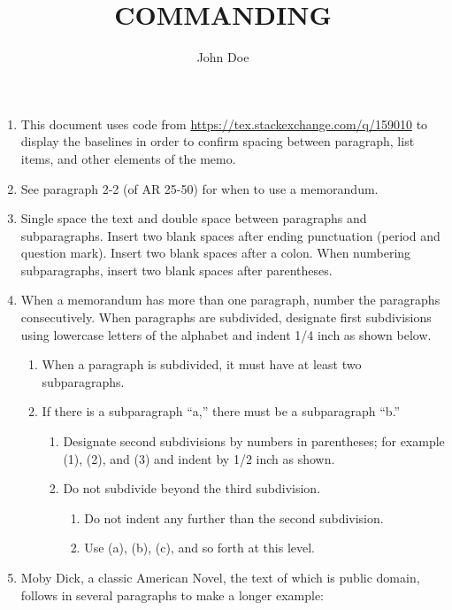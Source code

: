 \documentclass{armymemo}
\author{John Doe}\rank{CPT}\branch{CY}
\title{COMMANDING}
\begin{document}
\begin{enumerate}
\item This document uses code from \url{https://tex.stackexchange.com/q/159010}
  to display the baselines in order to confirm spacing between paragraph, list
  items, and other elements of the memo.
\item See paragraph 2-2 (of AR 25-50) for when to use a memorandum.
\item Single space the text and double space between paragraphs and subparagraphs. Insert two blank spaces after ending punctuation (period and question mark). Insert two blank spaces after a colon. When numbering subparagraphs, insert two blank spaces after parentheses.
\item When a memorandum has more than one paragraph, number the paragraphs consecutively. When paragraphs are subdivided, designate first subdivisions using lowercase letters of the alphabet and indent 1/4 inch as shown below.
  \begin{enumerate}
  \item When a paragraph is subdivided, it must have at least two subparagraphs.
  \item If there is a subparagraph ``a,'' there must be a subparagraph ``b.''
    \begin{enumerate}
    \item Designate second subdivisions by numbers in parentheses; for example (1), (2), and (3) and indent by 1/2 inch as shown.
    \item Do not subdivide beyond the third subdivision.
      \begin{enumerate}
      \item Do not indent any further than the second subdivision.
      \item Use (a), (b), (c), and so forth at this level.
      \end{enumerate}
    \end{enumerate}
  \end{enumerate}
\item Moby Dick, a classic American Novel, the text of which is public domain,
  follows in several paragraphs to make a longer example:


\end{enumerate}
\end{document}
